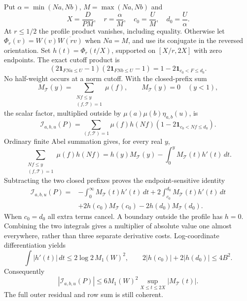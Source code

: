 \documentclass[11pt]{article}
\theoremstyle{definition}\newtheorem{definition}[theorem]{Definition}
\theoremstyle{remark}\newtheorem{remark}[theorem]{Remark}
\begin{document}
Put $\alpha=\min(Na,Nb)$, $M=\max(Na,Nb)$ and
\[
 X=\frac D{PM},\quad r=\frac\alpha M,\quad
 c_0=\frac U M,\quad d_0=\frac U\alpha.
\]
At $r\le1/2$ the profile product vanishes, including equality.
Otherwise let $\Phi_r(v)=W(v)\overline{W(rv)}$ when $Na=M$,
and use its conjugate in the reversed orientation. Set
$h(t)=\Phi_r(t/X)$, supported on $[X/r,2X]$ with zero endpoints.
The exact cutoff product is
\[
 (2\mathbf1_{FNa\le U}-1)(2\mathbf1_{FNb\le U}-1)
       =1-2\mathbf1_{c_0<F\le d_0}.
\]
No half-weight occurs at a norm cutoff. With the closed-prefix sum
\[
 M_{\mathcal T}(y)=\sum_{\substack{Nf\le y\\(f,\mathcal T)=1}}\mu(f),
 \qquad M_{\mathcal T}(y)=0\quad(y<1),
\]
the scalar factor, multiplied outside by
$\mu(a)\mu(b)\eta_{a,b}(u)$, is
\begin{equation}\label{cmr:scalar-kernel}
 \mathcal I_{a,b,u}(P)=
 \sum_{(f,\mathcal T)=1}\mu(f)h(Nf)
                   (1-2\mathbf1_{c_0<Nf\le d_0}).
\end{equation}
Ordinary finite Abel summation gives, for every real $y$,
\[
 \sum_{\substack{Nf\le y\\(f,\mathcal T)=1}}\mu(f)h(Nf)
   =h(y)M_{\mathcal T}(y)-\int_0^y M_{\mathcal T}(t)h'(t)\,dt.
\]
Subtracting the two closed prefixes proves the endpoint-sensitive identity
\begin{equation}\label{cmr:two-jump}
 \begin{split}
 \mathcal I_{a,b,u}(P)={}&-\int_0^\infty M_{\mathcal T}(t)h'(t)\,dt
              +2\int_{c_0}^{d_0}M_{\mathcal T}(t)h'(t)\,dt\\
       &+2h(c_0)M_{\mathcal T}(c_0)
                   -2h(d_0)M_{\mathcal T}(d_0).
 \end{split}
\end{equation}
When $c_0=d_0$ all extra terms cancel. A boundary outside the profile
has $h=0$. Combining the two integrals gives a multiplier of absolute
value one almost everywhere, rather than three separate derivative
costs. Log-coordinate differentiation yields
\[
 \int|h'(t)|\,dt\le2\log2\,M_1(W)^2,
 \qquad 2|h(c_0)|+2|h(d_0)|\le4B^2.
\]
Consequently
\begin{equation}\label{cmr:abel-variation}
 |\mathcal I_{a,b,u}(P)|
 \le6M_1(W)^2\sup_{X\le t\le2X}|M_{\mathcal T}(t)|.
\end{equation}
The full outer residual and row sum is still coherent.
\end{document}
